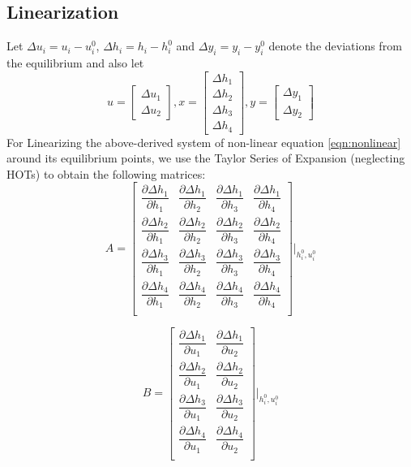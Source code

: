 \documentclass[10pt,a4paper, twocolumn]{article}
\begin{document}
\subsection{Linearization}
Let $\Delta u_i = u_i - u_i^0$, $\Delta h_i = h_i - h_i^0$ and $\Delta y_i = y_i - y_i^0$ denote the deviations from the equilibrium and also let \\ 
\[
u = 
\begin{bmatrix}
  \Delta u_1 \\
  \Delta u_2
\end{bmatrix}
,
x = 
\begin{bmatrix}
  \Delta h_1 \\
  \Delta h_2 \\
  \Delta h_3 \\
  \Delta h_4
\end{bmatrix}
,
y = 
\begin{bmatrix}
  \Delta y_1 \\
  \Delta y_2
\end{bmatrix}
\]
For Linearizing the above-derived system of non-linear equation \ref{eqn:nonlinear} around its equilibrium points, we use the Taylor Series of Expansion (neglecting HOTs) to obtain the following matrices:
\[
A =
\begin{bmatrix}
  \dfrac{\partial \Delta h_1}{\partial h_1} &
  \dfrac{\partial \Delta h_1}{\partial h_2} &
  \dfrac{\partial \Delta h_1}{\partial h_3} &
  \dfrac{\partial \Delta h_1}{\partial h_4} \\

  \dfrac{\partial \Delta h_2}{\partial h_1} &
  \dfrac{\partial \Delta h_2}{\partial h_2} &
  \dfrac{\partial \Delta h_2}{\partial h_3} &
  \dfrac{\partial \Delta h_2}{\partial h_4} \\

  \dfrac{\partial \Delta h_3}{\partial h_1} &
  \dfrac{\partial \Delta h_3}{\partial h_2} &
  \dfrac{\partial \Delta h_3}{\partial h_3} &
  \dfrac{\partial \Delta h_3}{\partial h_4} \\

  \dfrac{\partial \Delta h_4}{\partial h_1} &
  \dfrac{\partial \Delta h_4}{\partial h_2} &
  \dfrac{\partial \Delta h_4}{\partial h_3} &
  \dfrac{\partial \Delta h_4}{\partial h_4} \\
\end{bmatrix} \bigg |_{h_i^0, u_i^0}
\]

\[
B =
\begin{bmatrix}
  \dfrac{\partial \Delta h_1}{\partial u_1} &
  \dfrac{\partial \Delta h_1}{\partial u_2} \\

  \dfrac{\partial \Delta h_2}{\partial u_1} &
  \dfrac{\partial \Delta h_2}{\partial u_2} \\

  \dfrac{\partial \Delta h_3}{\partial u_1} &
  \dfrac{\partial \Delta h_3}{\partial u_2} \\

  \dfrac{\partial \Delta h_4}{\partial u_1} &
  \dfrac{\partial \Delta h_4}{\partial u_2} \\
\end{bmatrix} \bigg |_{h_i^0, u_i^0}
\]
\end{document}
